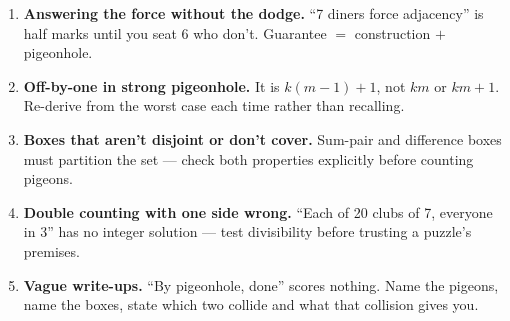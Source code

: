 \documentclass[11pt,a4paper]{article}
\begin{document}
\begin{enumerate}[leftmargin=2em, itemsep=4pt]
  \item \textbf{Answering the force without the dodge.} ``7 diners force adjacency'' is half marks until you seat 6 who don't. Guarantee $=$ construction $+$ pigeonhole. 
  \item \textbf{Off-by-one in strong pigeonhole.} It is $k(m-1)+1$, not $km$ or $km+1$. Re-derive from the worst case each time rather than recalling. 
  \item \textbf{Boxes that aren't disjoint or don't cover.} Sum-pair and difference boxes must partition the set --- check both properties explicitly before counting pigeons. 
  \item \textbf{Double counting with one side wrong.} ``Each of 20 clubs of 7, everyone in 3'' has no integer solution --- test divisibility before trusting a puzzle's premises. 
  \item \textbf{Vague write-ups.} ``By pigeonhole, done'' scores nothing. Name the pigeons, name the boxes, state which two collide and what that collision gives you. 
\end{enumerate}

\end{document}

